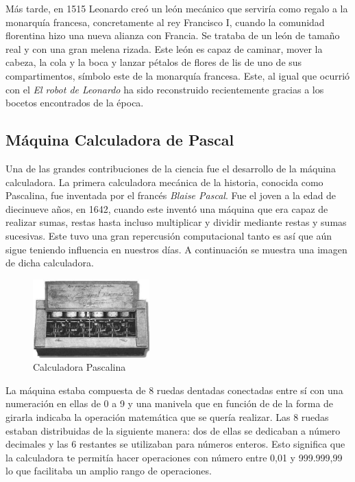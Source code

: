 Más tarde, en 1515 Leonardo creó un león mecánico que serviría como regalo a la monarquía francesa, concretamente al rey Francisco I, cuando la comunidad florentina hizo una nueva alianza con Francia. Se trataba de un león de tamaño real y con una gran melena rizada. Este león es capaz de caminar, mover la cabeza, la cola y la boca y lanzar pétalos de flores de lis de uno de sus compartimentos, símbolo este de la monarquía francesa. Este, al igual que ocurrió con el \textit{El robot de Leonardo} ha sido reconstruido recientemente gracias a los bocetos encontrados de la época.


\subsection{Máquina Calculadora de Pascal}

Una de las grandes contribuciones de la ciencia fue el desarrollo de la máquina calculadora. La primera calculadora mecánica de la historia, conocida como Pascalina, fue inventada por el francés \textit{Blaise Pascal}. Fue el joven a la edad de diecinueve años, en 1642, cuando este inventó una máquina que era capaz de realizar sumas, restas hasta incluso multiplicar y dividir mediante restas y sumas sucesivas. Este tuvo una gran repercusión computacional tanto es así que aún sigue teniendo influencia en nuestros días. A continuación se muestra una imagen de dicha calculadora.

\begin{figure}[H]
\begin{center}
  \includegraphics[width=0.4\textwidth]{./EtapaPrimeriza/imagenes/cp.jpg}
  \caption{Calculadora Pascalina}
  \label{cp}
\end{center}
\end{figure}

La máquina estaba compuesta de 8 ruedas dentadas conectadas entre sí con una numeración en ellas de 0 a 9 y una manivela que en función de de la forma de girarla indicaba la operación matemática que se quería realizar. Las 8 ruedas estaban distribuidas de la siguiente manera: dos de ellas se dedicaban a número decimales y las 6 restantes se utilizaban para números enteros. Esto significa que la calculadora te permitía hacer operaciones con número entre 0,01 y 999.999,99 lo que facilitaba un amplio rango de operaciones.\\

